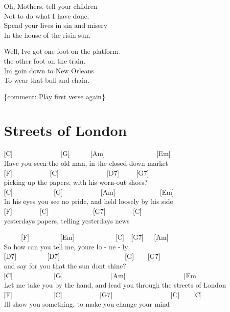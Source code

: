 \documentclass[
  letterpaper,
  a5paper]{memoir}
\begin{document}
Oh, Mothers, tell your children\\
Not to do what I have done.\\
Spend your lives in sin and misery\\
In the house of the risin\textquotesingle{} sun.

Well, I\textquotesingle ve got one foot on the platform.\\
the other foot on the train.\\
I\textquotesingle m goin\textquotesingle{} down to New Orleans\\
To wear that ball and chain.

\{comment: Play first verse again\}

\hypertarget{streets-of-london}{%
\chapter{Streets of London}\label{streets-of-london}}

{[}C{]}~~~~~~~~~~~~~~{[}G{]}~~~~~~{[}Am{]}~~~~~~~~~~~~~~~{[}Em{]}\\
Have you seen the old man, in the closed-down market\\
{[}F{]}~~~~~~~~~~~{[}C{]}~~~~~~~~~~~~~~{[}D7{]}~~~~~{[}G7{]}\\
picking up the papers, with his worn-out shoes?\\
{[}C{]}~~~~~~~~~~~~{[}G{]}~~~~~~~~~~~{[}Am{]}~~~~~~~~~~~~~{[}Em{]}\\
In his eyes you see no pride, and held loosely by his side\\
{[}F{]}~~~~~~~~{[}C{]}~~~~~~~~~~~~~{[}G7{]}~~~~~~~~{[}C{]}\\
yesterday\textquotesingle s papers, telling yesterday\textquotesingle s
news

~~~~~{[}F{]}~~~~~~~~~{[}Em{]}~~~~~~~~~~~~{[}C{]}~~{[}G7{]}~~~{[}Am{]}\\
\hspace*{0.333em}\hspace*{0.333em}\hspace*{0.333em}\hspace*{0.333em}So
how can you tell me, you\textquotesingle re lo - ne - ly\\
{[}D7{]}~~~~~~~~~{[}D7{]}~~~~~~~~~~~~~~~~~~~{[}G{]}~~~~{[}G7{]}\\
\hspace*{0.333em}\hspace*{0.333em}and say for you that the sun
don\textquotesingle t shine?\\
{[}C{]}~~~~~~~~~~~~{[}G{]}~~~~~~~~~~~~~~{[}Am{]}~~~~~~~~~~~~~~~~~{[}Em{]}\\
Let me take you by the hand, and lead you through the streets of
London\\
{[}F{]}~~~~~~~~~~~~{[}C{]}~~~~~~~~~~~{[}G7{]}~~~~~~~~~~~~~~~~~{[}C{]}~~~~{[}C{]}\\
\hspace*{0.333em}\hspace*{0.333em}I\textquotesingle ll show you
something, to make you change your mind
\end{document}
